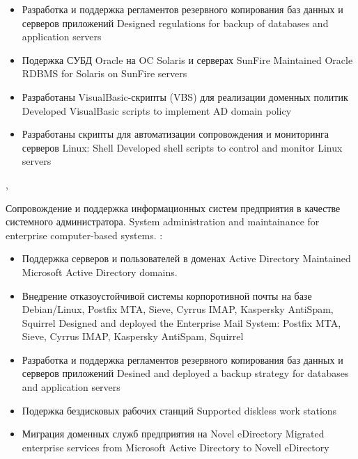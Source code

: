 \documentclass[11pt,a4paper,sans, russian]{moderncv}        %
\begin{document}
{\begin{itemize}
\begin{itemize}
\begin{itemize}
				{Designed traffic balance of mail system. Audited mail traffic.}
			\item {}
				{Реализована отказоустойчивость системы с использованием технологий виртуализации Linux/VServer и ipvs}
				{Designed fault tolerate mail system using Linux/VServer and ipvs}
			\end{itemize}
		\item {}
			{Разработка и поддержка регламентов резервного копирования баз данных и серверов приложений}	
			{Designed regulations for backup of databases and application servers}
		\item {}
			{Подержка СУБД Oracle на OC Solaris и серверах SunFire}
			{Maintained Oracle RDBMS for Solaris on SunFire servers}
		\item {}
			{Разработаны VisualBasic-скрипты (VBS) для реализации доменных политик}
			{Developed VisualBasic scripts to implement AD domain policy}
		\item {}
			{Разработаны скрипты для автоматизации сопровождения и мониторинга серверов Linux: Shell}
			{Developed shell scripts to control and monitor Linux servers}
	\end{itemize}
\end{itemize}
}

{\protect{}}
{\cityperm, \country}
{}
{
{Сопровождение и поддержка информационных систем предприятия в качестве системного администратора.}
{System administration and maintainance for enterprise computer-based systems.}\newline{}
\achievements:
\begin{itemize}
	\item {}
		{Поддержка серверов и пользователей в доменах Active Directory}
		{Maintained Microsoft Active Directory domains.}
	\item {}
		{Внедрение отказоустойчивой системы корпоротивной почты на базе Debian/Linux, Postfix MTA, Sieve, Cyrrus IMAP, Kaspersky AntiSpam, Squirrel}
		{Designed and deployed the Enterprise Mail System: Postfix MTA, Sieve, Cyrrus IMAP, Kaspersky AntiSpam, Squirrel}
	\item {}
		{Разработка и поддержка регламентов резервного копирования баз данных и серверов приложений}	
		{Desined and deployed a backup strategy for databases and application servers}
	\item {}
		{Подержка бездисковых рабочих станций}
		{Supported diskless work stations}
	\item {}
		{Миграция доменных служб предприятия на Novel eDirectory}
		{Migrated enterprise services from Microsoft Active Directory to Novell eDirectory}
\end{itemize}
}
\end{document}
